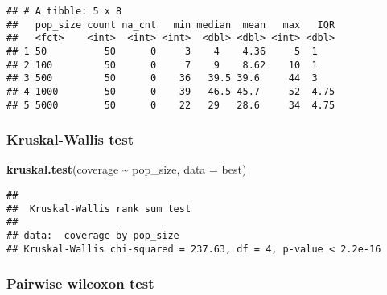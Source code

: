 \documentclass[
]{book}
\newenvironment{Shaded}{\begin{snugshade}}{\end{snugshade}}
\newcommand{\AttributeTok}[1]{\textcolor[rgb]{0.13,0.29,0.53}{#1}}
\newcommand{\ConstantTok}[1]{\textcolor[rgb]{0.56,0.35,0.01}{#1}}
\newcommand{\DecValTok}[1]{\textcolor[rgb]{0.00,0.00,0.81}{#1}}
\newcommand{\FunctionTok}[1]{\textcolor[rgb]{0.13,0.29,0.53}{\textbf{#1}}}
\newcommand{\NormalTok}[1]{#1}
\newcommand{\OtherTok}[1]{\textcolor[rgb]{0.56,0.35,0.01}{#1}}
\newcommand{\SpecialCharTok}[1]{\textcolor[rgb]{0.81,0.36,0.00}{\textbf{#1}}}
\newcommand{\StringTok}[1]{\textcolor[rgb]{0.31,0.60,0.02}{#1}}
\begin{document}
\begin{verbatim}
## # A tibble: 5 x 8
##   pop_size count na_cnt   min median  mean   max   IQR
##   <fct>    <int>  <int> <int>  <dbl> <dbl> <int> <dbl>
## 1 50          50      0     3    4    4.36     5  1   
## 2 100         50      0     7    9    8.62    10  1   
## 3 500         50      0    36   39.5 39.6     44  3   
## 4 1000        50      0    39   46.5 45.7     52  4.75
## 5 5000        50      0    22   29   28.6     34  4.75
\end{verbatim}

\hypertarget{kruskal-wallis-test-5}{%
\subsubsection{Kruskal-Wallis test}\label{kruskal-wallis-test-5}}

\begin{Shaded}
\begin{Highlighting}[]
\FunctionTok{kruskal.test}\NormalTok{(coverage }\SpecialCharTok{\textasciitilde{}}\NormalTok{ pop\_size, }\AttributeTok{data =}\NormalTok{ best)}
\end{Highlighting}
\end{Shaded}

\begin{verbatim}
## 
##  Kruskal-Wallis rank sum test
## 
## data:  coverage by pop_size
## Kruskal-Wallis chi-squared = 237.63, df = 4, p-value < 2.2e-16
\end{verbatim}

\hypertarget{pairwise-wilcoxon-test-5}{%
\subsubsection{Pairwise wilcoxon test}\label{pairwise-wilcoxon-test-5}}

\begin{Shaded}
\end{Shaded}
\end{document}
